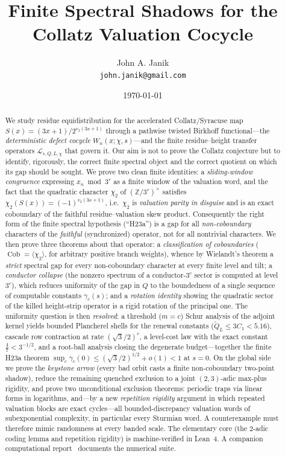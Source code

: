 \documentclass[11pt]{article}
\title{Finite Spectral Shadows for the Collatz Valuation Cocycle}
\author{John A. Janik\\\texttt{john.janik@gmail.com}}
\date{\today}
\newcommand{\Z}{\mathbb{Z}}
\newcommand{\Lcal}{\mathcal{L}}
\theoremstyle{plain}
\theoremstyle{definition}
\theoremstyle{remark}
\begin{document}
\maketitle

\begin{abstract}
We study residue equidistribution for the accelerated Collatz/Syracuse map
$S(x)=(3x+1)/2^{v_2(3x+1)}$ through a pathwise twisted Birkhoff functional---the
\emph{deterministic defect cocycle} $W_n(x;\chi,s)$---and the finite
residue--height transfer operators $\Lcal_{s,Q,L,\chi}$ that govern it. Our aim
is not to prove the Collatz conjecture but to identify, rigorously, the correct
finite spectral object and the correct quotient on which its gap should be
sought. We prove two clean finite identities: a \emph{sliding-window congruence}
expressing $x_n\bmod 3^r$ as a finite window of the valuation word, and the fact
that the quadratic character $\chi_2$ of $(\Z/3^r)^\times$ satisfies
$\chi_2(S(x))=(-1)^{v_2(3x+1)}$, i.e.\ $\chi_2$ is \emph{valuation parity in
disguise} and is an exact coboundary of the faithful residue--valuation skew
product. Consequently the right form of the finite spectral hypothesis (``H23a'')
is a gap for all \emph{non-coboundary} characters of the \emph{faithful}
(synchronized) operator, not for all nontrivial characters. We then prove three
theorems about that operator: a \emph{classification of coboundaries}
($\operatorname{Cob}=\langle\chi_2\rangle$, for arbitrary positive branch
weights), whence by Wielandt's theorem a \emph{strict} spectral gap for every
non-coboundary character at every finite level and tilt; a \emph{conductor
collapse} (the nonzero spectrum of a conductor-$3^c$ sector is computed at level
$3^c$), which reduces uniformity of the gap in $Q$ to the boundedness of a
single sequence of computable constants $\gamma_c(s)$; and a \emph{rotation
identity} showing the quadratic sector of the killed height-strip operator is a
rigid rotation of the principal one. The uniformity question is then
\emph{resolved}: a threshold ($m=c$) Schur analysis of the adjoint kernel
yields bounded Plancherel shells for the renewal constants
($\tilde Q_L\le3C_1<5.16$), cascade row contraction at rate $(\sqrt3/2)^c$,
a level-cost law with the exact constant $\tfrac47<3^{-1/2}$, and a
root-ball analysis closing the degenerate budget---together the finite
H23a theorem $\sup_c\gamma_c(0)\le(\sqrt3/2)^{1/2}+o(1)<1$ at $s=0$. On
the global side we prove the \emph{keystone arrow} (every bad orbit casts
a finite non-coboundary two-point shadow), reduce the remaining quenched
exclusion to a joint $(2,3)$-adic max-plus rigidity, and prove two
unconditional exclusion theorems: periodic traps via linear forms in
logarithms, and---by a new \emph{repetition rigidity} argument in which
repeated valuation blocks are exact cycles---all bounded-discrepancy
valuation words of subexponential complexity, in particular every
Sturmian word. A counterexample must therefore mimic randomness at every
banded scale. The elementary core (the $2$-adic coding lemma and
repetition rigidity) is machine-verified in Lean~4. A companion
computational report~\cite{companion} documents the numerical suite.
\end{abstract}
\end{document}
